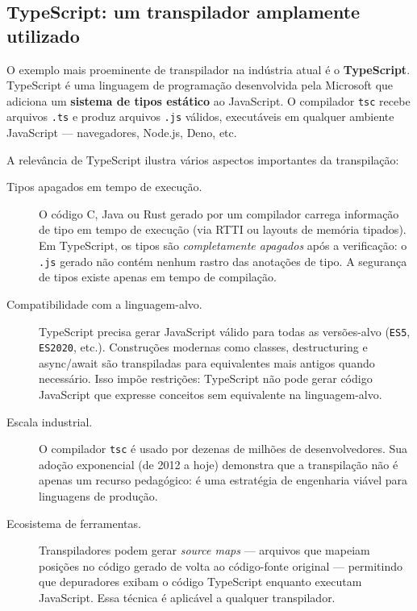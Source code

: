 \subsection{TypeScript: um transpilador amplamente utilizado}

O exemplo mais proeminente de transpilador na indústria atual é o
\textbf{TypeScript}.  TypeScript é uma linguagem de programação desenvolvida
pela Microsoft que adiciona um \textbf{sistema de tipos estático} ao
JavaScript.  O compilador \texttt{tsc} recebe arquivos \texttt{.ts} e produz
arquivos \texttt{.js} válidos, executáveis em qualquer ambiente JavaScript
— navegadores, Node.js, Deno, etc.

A relevância de TypeScript ilustra vários aspectos importantes da
transpilação:

\begin{description}
  \item[Tipos apagados em tempo de execução.]  O código C, Java ou Rust
    gerado por um compilador carrega informação de tipo em tempo de execução
    (via RTTI ou layouts de memória tipados).  Em TypeScript, os tipos são
    \emph{completamente apagados} após a verificação: o \texttt{.js} gerado
    não contém nenhum rastro das anotações de tipo.  A segurança de tipos
    existe apenas em tempo de compilação.

  \item[Compatibilidade com a linguagem-alvo.]  TypeScript precisa gerar
    JavaScript válido para todas as versões-alvo (\texttt{ES5}, \texttt{ES2020},
    etc.).  Construções modernas como classes, destructuring e async/await são
    transpiladas para equivalentes mais antigos quando necessário.  Isso impõe
    restrições: TypeScript não pode gerar código JavaScript que expresse
    conceitos sem equivalente na linguagem-alvo.

  \item[Escala industrial.]  O compilador \texttt{tsc} é usado por dezenas
    de milhões de desenvolvedores.  Sua adoção exponencial (de 2012 a hoje)
    demonstra que a transpilação não é apenas um recurso pedagógico: é uma
    estratégia de engenharia viável para linguagens de produção.

  \item[Ecosistema de ferramentas.]  Transpiladores podem gerar
    \emph{source maps} — arquivos que mapeiam posições no código gerado de
    volta ao código-fonte original — permitindo que depuradores exibam o
    código TypeScript enquanto executam JavaScript.  Essa técnica é aplicável
    a qualquer transpilador.
\end{description}


